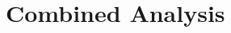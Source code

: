 \documentclass[12pt,letter]{article}
\begin{document}
	
%	

	\setcounter{section}{8}	

\section{Combined Analysis}










	\pagebreak
	\renewcommand{\thepage}{}
	\renewcommand\refname{References Cited}
	\pagestyle{plain}
	
	
\end{document}
